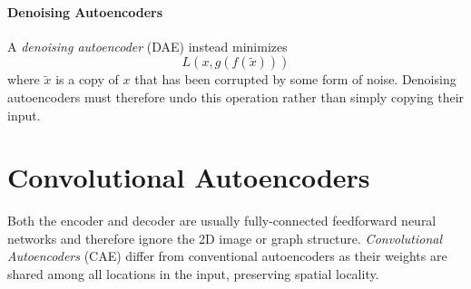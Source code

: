 \documentclass[pdftex,10pt,a4paper]{scrartcl}
\begin{document}
\paragraph{Denoising Autoencoders}

A \emph{denoising autoencoder} (DAE) instead minimizes
\begin{equation*}
  L(x, g(f(\tilde{x})))
\end{equation*}
where $\tilde{x}$ is a copy of $x$ that has been corrupted by some form of noise.
Denoising autoencoders must therefore undo this operation rather than simply copying their input.

\section{Convolutional Autoencoders}

Both the encoder and decoder are usually fully-connected feedforward neural networks and therefore ignore the 2D image or graph structure.
\emph{Convolutional Autoencoders} (CAE) differ from conventional autoencoders as their weights are shared among all locations in the input, preserving spatial locality.
\end{document}

